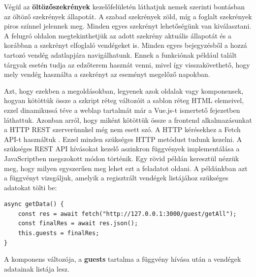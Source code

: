 \documentclass[12pt]{article}
\begin{document}
Végül az \textbf{öltözőszekrények} kezelőfelületén láthatjuk nemek szerinti bontásban az öltöző szekrények állapotát. A szabad szekrények zöld, míg a foglalt szekrények piros színnel jelennek meg. Minden egyes szekrényt lehetőségünk van kiválasztani. A felugró oldalon megtekinthetjük az adott szekrény aktuális állapotát és a korábban a szekrényt elfoglaló vendégeket is. Minden egyes bejegyzésből a hozzá tartozó vendég adatlapjára navigálhatunk. Ennek a funkciónak például talált tárgyak esetén tudja az edzőterem hasznát venni, mivel így visszakövethető, hogy mely vendég használta a szekrényt az eseményt megelőző napokban.

Azt, hogy ezekben a megoldásokban, legyenek azok oldalak vagy komponensek, hogyan kötöttük össze a szkript réteg változóit a sablon réteg HTML elemeivel, ezzel dinamikussá téve a weblap tartalmát már a Vue.js-t ismertető fejezetben láthattuk. Azonban arról, hogy miként kötöttük össze a frontend alkalmazásunkat a HTTP REST szerverünnkel még nem esett szó. A HTTP kérésekhez a Fetch API-t használtuk \cite{FETCH_API}. Ezzel minden szükséges HTTP metódust tudunk kezelni. A szükséges REST API hívásokat kezelő aszinkron függvények implementálása a JavaScriptben megszokott módon történik. Egy rövid példán keresztül nézzük meg, hogy milyen egyszerűen meg lehet ezt a feladatot oldani. A példánkban azt a függvényt vizsgáljuk, amelyik a regisztrált vendégek listájához szükséges adatokat tölti be:
\begin{verbatim}
async getData() {
    const res = await fetch("http://127.0.0.1:3000/guest/getAll");
    const finalRes = await res.json();
    this.guests = finalRes;
}
\end{verbatim}

A komponens változója, a \textbf{guests} tartalma a függvény hívása után a vendégek adatainak listája lesz.
\end{document}
